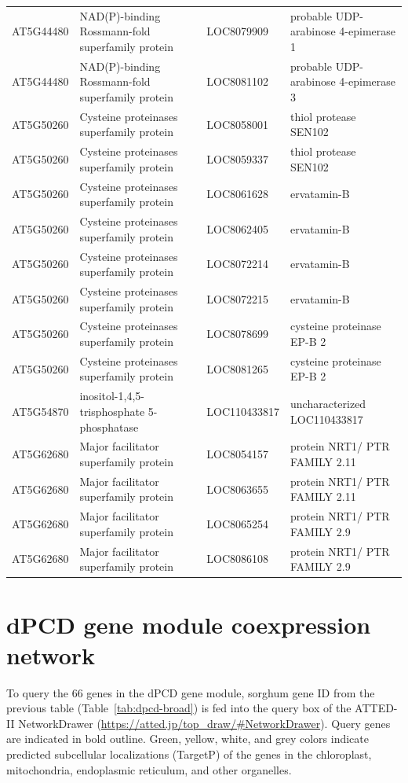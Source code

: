 \begin{longtable}{l p{5.5cm} l p{4.5cm}}
        AT5G44480 & NAD(P)-binding Rossmann-fold superfamily protein & LOC8079909 & probable UDP-arabinose 4-epimerase 1 \\
        AT5G44480 & NAD(P)-binding Rossmann-fold superfamily protein & LOC8081102 & probable UDP-arabinose 4-epimerase 3 \\
        AT5G50260 & Cysteine proteinases superfamily protein & LOC8058001 & thiol protease SEN102 \\
        AT5G50260 & Cysteine proteinases superfamily protein & LOC8059337 & thiol protease SEN102 \\
        AT5G50260 & Cysteine proteinases superfamily protein & LOC8061628 & ervatamin-B \\
        AT5G50260 & Cysteine proteinases superfamily protein & LOC8062405 & ervatamin-B \\
        AT5G50260 & Cysteine proteinases superfamily protein & LOC8072214 & ervatamin-B \\
        AT5G50260 & Cysteine proteinases superfamily protein & LOC8072215 & ervatamin-B \\
        AT5G50260 & Cysteine proteinases superfamily protein & LOC8078699 & cysteine proteinase EP-B 2 \\
        AT5G50260 & Cysteine proteinases superfamily protein & LOC8081265 & cysteine proteinase EP-B 2 \\
        AT5G54870 & inositol-1,4,5-trisphosphate 5-phosphatase & LOC110433817 & uncharacterized LOC110433817 \\
        AT5G62680 & Major facilitator superfamily protein & LOC8054157 & protein NRT1/ PTR FAMILY 2.11 \\
        AT5G62680 & Major facilitator superfamily protein & LOC8063655 & protein NRT1/ PTR FAMILY 2.11 \\
        AT5G62680 & Major facilitator superfamily protein & LOC8065254 & protein NRT1/ PTR FAMILY 2.9 \\
        AT5G62680 & Major facilitator superfamily protein & LOC8086108 & protein NRT1/ PTR FAMILY 2.9 \\
\end{longtable}

\clearpage
\section{dPCD gene module coexpression network}
\hspace{1em}To query the 66 genes in the dPCD gene module, sorghum gene ID from the previous table (Table~\ref{tab:dpcd-broad}) is fed into the query box of the ATTED-II NetworkDrawer (\url{https://atted.jp/top_draw/#NetworkDrawer}). Query genes are indicated in bold outline. Green, yellow, white, and grey colors indicate predicted subcellular localizations (TargetP) of the genes in the chloroplast, mitochondria, endoplasmic reticulum, and other organelles.

